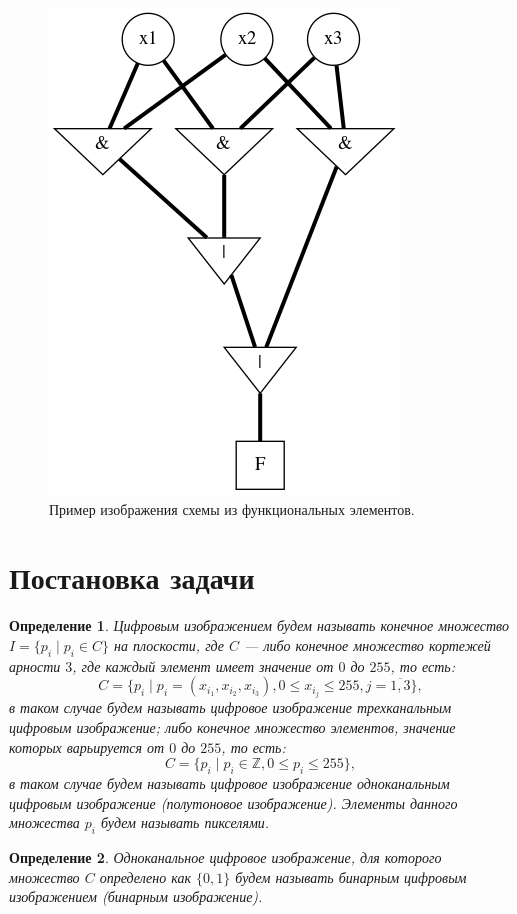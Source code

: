 \documentclass[makeidx, a4paper, 14pt]{extarticle}
\newcommand{\Z}{\mathbb{Z}}
\newtheorem{definition}{Определение}
\begin{document}
\begin{figure}[!h]
    \centering
    \includegraphics[scale=0.75]{img4.png}
    \caption{Пример изображения схемы из функциональных элементов.}
\end{figure}

\section{Постановка задачи}

\begin{definition}
    Цифровым изображением будем называть конечное множество ${I = \{p_i \mid p_i \in C\}}$ на плоскости,
    где $C$ --- либо конечное множество кортежей арности $3$, где каждый элемент имеет значение от $0$ до $255$,
    то есть: \[ {C=\{p_i \mid p_i=({x_{i_1}}, {x_{i_2}}, {x_{i_3}}), 0 \leq {x_{i_j}} \leq 255, j=\overline{1,3}\}}, \]
    в таком случае будем называть цифровое изображение трехканальным цифровым изображение;
    либо конечное множество элементов, значение которых варьируется от $0$ до $255$, то есть: \[ {C=\{p_i \mid p_i \in \Z, 0 \leq p_i \leq 255\}}, \]
    в таком случае будем называть цифровое изображение одноканальным цифровым изображение (полутоновое изображение). Элементы данного множества $p_i$ будем называть пикселями.
\end{definition}

\begin{definition}
    Одноканальное цифровое изображение, для которого множество $C$ определено как ${\{0, 1\}}$ будем называть бинарным цифровым изображением (бинарным изображение).
\end{definition}
\end{document}
